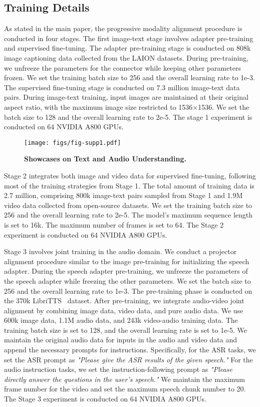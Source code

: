 \subsection{Training Details}

As stated in the main paper, the progressive modality alignment procedure is conducted in four stages. The first image-text stage involves adapter pre-training and supervised fine-tuning. The adapter pre-training stage is conducted on 808k image captioning data collected from the LAION datasets. During pre-training, we unfreeze the parameters for the connector while keeping other parameters frozen. We set the training batch size to 256 and the overall learning rate to 1e-3. The supervised fine-tuning stage is conducted on 7.3 million image-text data pairs. During image-text training, input images are maintained at their original aspect ratio, with the maximum image size restricted to 1536×1536. We set the batch size to 128 and the overall learning rate to 2e-5. The stage 1 experiment is conducted on 64 NVIDIA A800 GPUs.

\begin{figure*}[t]
\centering
\texttt{[image: figs/fig-supp1.pdf]}
\caption{\textbf{Showcases on Text and Audio Understanding.}}
\label{fig:supp1}
\end{figure*}

Stage 2 integrates both image and video data for supervised fine-tuning, following most of the training strategies from Stage 1. The total amount of training data is 2.7 million, comprising 800k image-text pairs sampled from Stage 1 and 1.9M video data collected from open-source datasets. We set the training batch size to 256 and the overall learning rate to 2e-5. The model's maximum sequence length is set to 16k. The maximum number of frames is set to 64. The Stage 2 experiment is conducted on 64 NVIDIA A800 GPUs. 

Stage 3 involves joint training in the audio domain. We conduct a projector alignment procedure similar to the image pre-training for initializing the speech adapter. During the speech adapter pre-training, we unfreeze the parameters of the speech adapter while freezing the other parameters. We set the batch size to 256 and the overall learning rate to 1e-3. The pre-training phase is conducted on the 370k LibriTTS~\citep{zen2019libritts} dataset. After pre-training, we integrate audio-video joint alignment by combining image data, video data, and pure audio data. We use 600k image data, 1.1M audio data, and 243k video-audio training data. The training batch size is set to 128, and the overall learning rate is set to 1e-5. We maintain the original audio data for inputs in the audio and video data and append the necessary prompts for instructions. Specifically, for the ASR tasks, we set the ASR prompt as \textit{"Please give the ASR results of the given speech."} For the audio instruction tasks, we set the instruction-following prompt as \textit{"Please directly answer the questions in the user's speech."} We maintain the maximum frame number for the video and set the maximum speech chunk number to 20. The Stage 3 experiment is conducted on 64 NVIDIA A800 GPUs.

